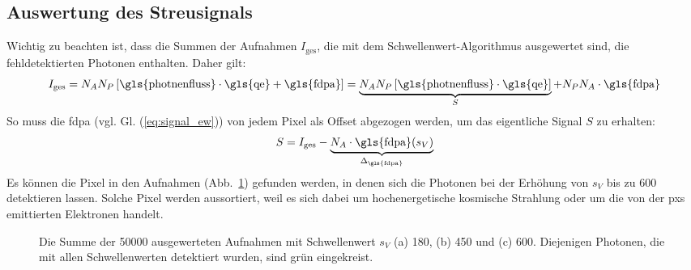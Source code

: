 \subsection{Auswertung des Streusignals}
Wichtig zu beachten ist, dass die Summen der Aufnahmen $I_\text{ges}$, die mit dem Schwellenwert-Algo\-rith\-mus ausgewertet sind, die fehldetektierten Photonen enthalten. Daher gilt:
\begin{equation}
    I_\text{ges} = N_A N_P \left[\text{\gls{photnenfluss}}\cdot \text{\gls{qe}} + \text{\gls{fdpa}}\right] = \underbrace{N_A N_P \left[\text{\gls{photnenfluss}}\cdot \text{\gls{qe}}\right]}_{S} + N_P N_A\cdot\text{\gls{fdpa}}
\end{equation}
So muss die \gls{fdpa} (vgl. Gl. (\ref{eq:signal_ew})) von jedem Pixel als Offset abgezogen werden, um das eigentliche Signal $S$ zu erhalten:
\begin{equation}
    S = I_\text{ges} - \underbrace{N_A\cdot\text{\gls{fdpa}}(s_V)}_{\Delta_\text{\gls{fdpa}}}
    \label{eq:signal_int_fpda}
\end{equation}
%
\noindent
Es können die Pixel in den Aufnahmen (Abb.~\ref{fig:th_180_450_600}) gefunden werden, in denen sich die Photonen bei der Erhöhung von $s_V$ bis zu \SI{600}{\adu} detektieren lassen. Solche Pixel werden aussortiert, weil es sich dabei um hochenergetische kosmische Strahlung oder um die von der \gls{pxs} emittierten Elektronen handelt.
\begin{figure}[H]
    \centering
    
    \caption{Die Summe der \num{50000} ausgewerteten Aufnahmen mit Schwellenwert $s_V$ (a) \SI{180}{\adu}, (b) \SI{450}{\adu} und (c) \SI{600}{\adu}. Diejenigen Photonen, die mit allen Schwellenwerten detektiert wurden, sind grün eingekreist.}
    \label{fig:th_180_450_600}
\end{figure}

